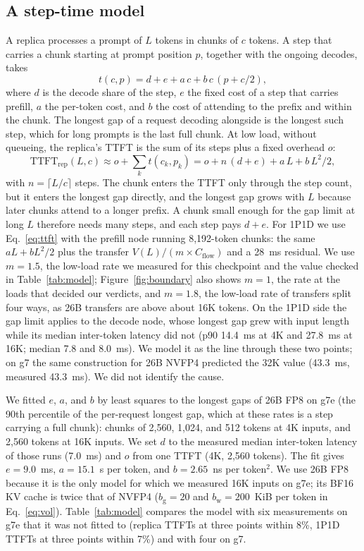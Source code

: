 \documentclass[11pt]{article}
\begin{document}
\subsection{A step-time model}\label{sec:model}
A replica processes a prompt of $L$ tokens in chunks of $c$ tokens. A step that carries a chunk starting at prompt position $p$, together with the ongoing decodes, takes
\begin{equation}\label{eq:step}
t(c, p) = d + e + a\,c + b\,c\,(p + c/2),
\end{equation}
where $d$ is the decode share of the step, $e$ the fixed cost of a step that carries prefill, $a$ the per-token cost, and $b$ the cost of attending to the prefix and within the chunk. The longest gap of a request decoding alongside is the longest such step, which for long prompts is the last full chunk. At low load, without queueing, the replica's TTFT is the sum of its steps plus a fixed overhead $o$:
\begin{equation}\label{eq:ttftrep}
\mathrm{TTFT}_{\mathrm{rep}}(L, c) \approx o + \sum_k t(c_k, p_k) = o + n\,(d + e) + a\,L + b\,L^2/2,
\end{equation}
with $n = \lceil L/c \rceil$ steps. The chunk enters the TTFT only through the step count, but it enters the longest gap directly, and the longest gap grows with $L$ because later chunks attend to a longer prefix. A chunk small enough for the gap limit at long $L$ therefore needs many steps, and each step pays $d + e$. For 1P1D we use Eq.~\eqref{eq:ttft} with the prefill node running 8,192-token chunks: the same $aL + bL^2/2$ plus the transfer $V(L)/(m \times C_{\mathrm{flow}})$ and a 28~ms residual. We use $m = 1.5$, the low-load rate we measured for this checkpoint and the value checked in Table~\ref{tab:model}; Figure~\ref{fig:boundary} also shows $m = 1$, the rate at the loads that decided our verdicts, and $m = 1.8$, the low-load rate of transfers split four ways, as 26B transfers are above about 16K tokens. On the 1P1D side the gap limit applies to the decode node, whose longest gap grew with input length while its median inter-token latency did not (p90 14.4~ms at 4K and 27.8~ms at 16K; median 7.8 and 8.0~ms). We model it as the line through these two points; on g7 the same construction for 26B NVFP4 predicted the 32K value (43.3~ms, measured 43.3~ms). We did not identify the cause.

We fitted $e$, $a$, and $b$ by least squares to the longest gaps of 26B FP8 on g7e (the 90th percentile of the per-request longest gap, which at these rates is a step carrying a full chunk): chunks of 2,560, 1,024, and 512 tokens at 4K inputs, and 2,560 tokens at 16K inputs. We set $d$ to the measured median inter-token latency of those runs (7.0~ms) and $o$ from one TTFT (4K, 2,560 tokens). The fit gives $e = 9.0$~ms, $a = 15.1$~\textmu s per token, and $b = 2.65$~ns per token$^2$. We use 26B FP8 because it is the only model for which we measured 16K inputs on g7e; its BF16 KV cache is twice that of NVFP4 ($b_{\mathrm{g}} = 20$ and $b_{\mathrm{w}} = 200$~KiB per token in Eq.~\eqref{eq:vol}). Table~\ref{tab:model} compares the model with six measurements on g7e that it was not fitted to (replica TTFTs at three points within 8\%, 1P1D TTFTs at three points within 7\%) and with four on g7.
\end{document}
